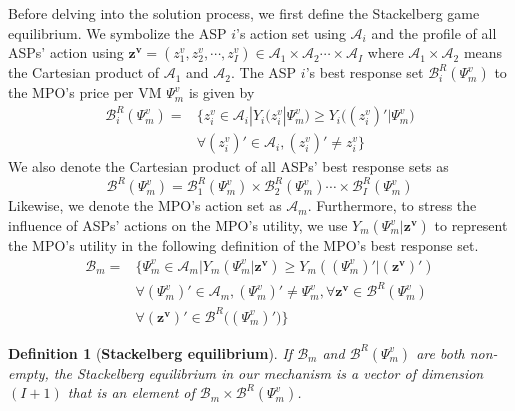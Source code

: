 \documentclass[conference]{IEEEtran}
\newtheorem{definition}{Definition}
\begin{document}
\iffalse
Before delving into the solution process, we first define the Stackelberg game equilibrium. We symbolize the ASP $i$'s action set using $\mathcal{A}_i$ and the profile of all ASPs' action using $\bm{z^v}=(z_1^v, z_2^v, \cdots, z_I^v) \in \mathcal{A}_1 \times \mathcal{A}_2 \cdots \times \mathcal{A}_I$ where $\mathcal{A}_1 \times \mathcal{A}_2$ means the Cartesian product of $\mathcal{A}_1$ and $\mathcal{A}_2$. The ASP $i$'s best response set $\mathcal{B}_i^R(\Psi_m^v)$ to the MPO's price per VM $\Psi_m^v$ is given by
\begin{equation} \label{eqn:asp_best_response}
\begin{aligned}
\mathcal{B}_i^R(\Psi_m^v) = &\{z_i^v \in \mathcal{A}_i |Y_i(z_i^v|\Psi_m^v) \geq Y_i\big((z_i^v)'|\Psi_m^v\big) \\
&\forall (z_i^v)' \in \mathcal{A}_i, (z_i^v)' \neq z_i^v\}
\end{aligned}
\end{equation}
We also denote the Cartesian product of all ASPs' best response sets as
\begin{equation}
\mathcal{B}^R(\Psi_m^v) = \mathcal{B}_1^R(\Psi_m^v) \times \mathcal{B}_2^R(\Psi_m^v) \cdots \times \mathcal{B}_I^R(\Psi_m^v)
\end{equation}
Likewise, we denote the MPO's action set as $\mathcal{A}_m$. Furthermore, to stress the influence of ASPs' actions on the MPO's utility, we use $Y_m(\Psi_m^v|\bm{z^v})$ to represent the MPO's utility in the following definition of the MPO's best response set.
\begin{equation} \label{eqn:mpo_best_response}
\begin{aligned}
\mathcal{B}_m = &\{\Psi_m^v \in \mathcal{A}_m| Y_m(\Psi_m^v|\bm{z^v}) \geq Y_m((\Psi_m^v)'|(\bm{z^v})') \\
&\forall (\Psi_m^v)' \in \mathcal{A}_m, (\Psi_m^v)' \neq \Psi_m^v, \forall \bm{z^v} \in \mathcal{B}^R(\Psi_m^v) \\
&\forall  (\bm{z^v})' \in \mathcal{B}^R\big((\Psi_m^v)'\big)\}
\end{aligned}
\end{equation}
\begin{definition}[\textbf{Stackelberg equilibrium}] \label{def:stackelberg_equilibrium}
If $\mathcal{B}_{m}$ and $\mathcal{B}^R(\Psi_m^v)$ are both non-empty, the Stackelberg equilibrium in our mechanism is a vector of dimension $(I+1)$ that is an element of $\mathcal{B}_m  \times \mathcal{B}^R(\Psi_m^v)$.
\end{definition}
\end{document}
